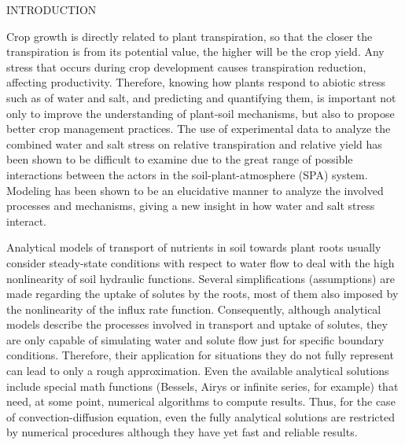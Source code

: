 \cleardoublepage

\def\quic{Quirijn's COMMENT: }

\chap INTRODUCTION

Crop growth is directly related to plant transpiration, so that the closer the transpiration is from its potential value, the higher will be the crop yield. 
Any stress that occurs during crop development causes transpiration reduction, affecting productivity. 
Therefore, knowing how plants respond to abiotic stress such as of water and salt, and predicting and quantifying them, is important not only to improve the understanding of plant-soil mechanisms, but also to propose better crop management practices.
The use of experimental data to analyze the combined water and salt stress on relative transpiration and relative yield has been shown to be difficult to examine due to the great range of possible interactions between the actors in the soil-plant-atmosphere (SPA) system.
Modeling has been shown to be an elucidative manner to analyze the involved processes and mechanisms, giving a new insight in how water and salt stress interact.

Analytical models of transport of nutrients in soil towards plant roots usually consider steady-state conditions with respect to water flow to deal with the high nonlinearity of soil hydraulic functions. 
Several simplifications (assumptions) are made regarding the uptake of solutes by the roots, most of them also imposed by the nonlinearity of the influx rate function. 
Consequently, although analytical models describe the processes involved in transport and uptake of solutes, they are only capable of simulating water and solute flow just for specific boundary conditions.
Therefore, their application for situations they do not fully represent can lead to only a rough approximation.
Even the available analytical solutions include special math functions (Bessels, Airys or infinite series, for example) that need, at some point, numerical algorithms to compute results.
Thus, for the case of convection-diffusion equation, even the fully analytical solutions are restricted by numerical procedures although they have yet fast and reliable results.

